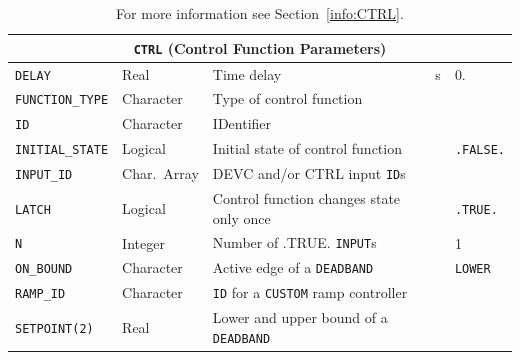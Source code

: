 \documentclass[11pt]{book}
\newcommand{\ct}{\tt\small}
\begin{document}
\begin{table}[H]
\caption{For more information see Section~\ref{info:CTRL}.}\label{tbl:CTRL}
\noindent
\begin{tabular*}{6.5in}{@{\extracolsep\fill}|l|l|l|l|l|}
\hline
\multicolumn{5}{|c|}{{\ct CTRL} (Control Function Parameters)} \\ \hline \hline
{\ct DELAY}          & Real         & Time delay                                  & s  &  0.                       \\ \hline
{\ct FUNCTION\_TYPE} & Character    & Type of control function                    &    &                           \\ \hline
{\ct ID}             & Character    & IDentifier                                  &    &                           \\ \hline
{\ct INITIAL\_STATE} & Logical      & Initial state of control function           &    & {\ct .FALSE.}             \\ \hline
{\ct INPUT\_ID}      & Char.~Array  & DEVC and/or CTRL input {\ct ID}s            &    &                           \\ \hline
{\ct LATCH}          & Logical      & Control function changes state only once    &    & {\ct .TRUE.}              \\ \hline
{\ct N}              & Integer      & Number of .TRUE. {\ct INPUT}s               &    &   1                       \\ \hline
{\ct ON\_BOUND}      & Character    & Active edge of a {\ct DEADBAND}             &    & {\ct LOWER}               \\ \hline
{\ct RAMP\_ID}       & Character    & {\ct ID} for a {\ct CUSTOM} ramp controller &    &                           \\ \hline
{\ct SETPOINT(2)}    & Real         & Lower and upper bound of a {\ct DEADBAND}   &    &                           \\ \hline
\end{tabular*}
\end{table}
\end{document}
